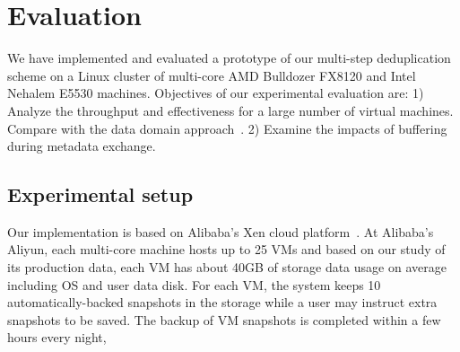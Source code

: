 
\section{Evaluation}
\label{sect:exper}

We have implemented and evaluated a prototype of our multi-step deduplication scheme on a Linux cluster
of multi-core AMD Bulldozer FX8120 and Intel Nehalem E5530 machines.  Objectives of our experimental evaluation are:
1) Analyze the throughput and effectiveness for a large number of virtual machines.
Compare with the data domain approach~\cite{bottleneck08}.
2) Examine the impacts of buffering during metadata exchange.

\subsection{Experimental setup}

Our implementation is based on Alibaba's Xen cloud platform~\cite{Aliyun,WeiZhangIEEE}.  
At Alibaba's Aliyun, each multi-core machine   hosts  up to 25 VMs and 
based on our study of its production  data,  each VM has about  40GB of storage  data usage on average
including OS and user data disk.  
For each VM, the system keeps 10 automatically-backed snapshots in the storage while
a user may instruct extra snapshots to be saved.
The backup of VM snapshots is completed within a few  hours every night,



